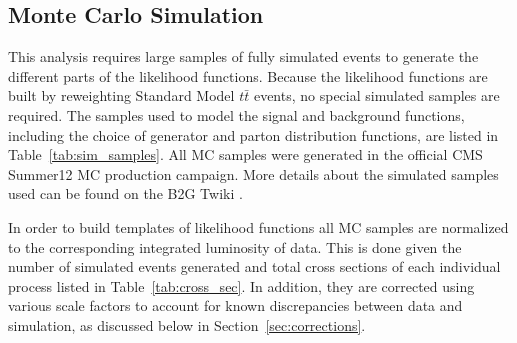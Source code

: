 \documentclass{cmspaperpdf}
\begin{document}
\subsection{Monte Carlo Simulation}

This analysis requires large samples of fully simulated events to generate the different parts of the likelihood functions.  Because the likelihood functions are built by reweighting Standard Model $t\bar t$ events, no special simulated samples are required.  The samples used to model the signal and background functions, including the choice of generator and parton distribution functions, are listed in Table~\ref{tab:sim_samples}. All MC samples were generated in the official CMS Summer12 MC production campaign. More details about the simulated samples used can be found on the B2G Twiki \cite{B2G_twiki}.

In order to build templates of likelihood functions all MC samples are normalized to the corresponding integrated luminosity of data. This is done given the number of simulated events generated and total cross sections of each individual process listed in Table~\ref{tab:cross_sec}. In addition, they are corrected using various scale factors to account for known discrepancies between data and simulation, as discussed below in Section~\ref{sec:corrections}.
\end{document}
